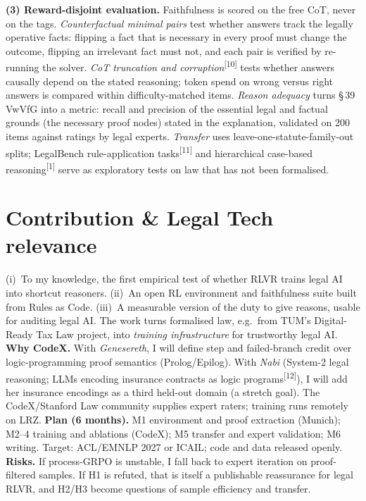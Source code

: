 \documentclass[10pt,a4paper]{article}
\newcommand{\cit}[1]{\textsuperscript{\color{muted}[#1]}}
\newcommand{\step}[1]{\textbf{\color{tum}#1}}
\begin{document}
\step{(3) Reward-disjoint evaluation.} Faithfulness is scored on the free CoT, never on the tags. \emph{Counterfactual minimal pairs} test whether answers track the legally operative facts: flipping a fact that is necessary in every proof must change the outcome, flipping an irrelevant fact must not, and each pair is verified by re-running the solver. \emph{CoT truncation and corruption}\cit{10} tests whether answers causally depend on the stated reasoning; token spend on wrong versus right answers is compared within difficulty-matched items. \emph{Reason adequacy} turns §\,39 VwVfG into a metric: recall and precision of the essential legal and factual grounds (the necessary proof nodes) stated in the explanation, validated on 200 items against ratings by legal experts. \emph{Transfer} uses leave-one-statute-family-out splits; LegalBench rule-application tasks\cit{11} and hierarchical case-based reasoning\cit{1} serve as exploratory tests on law that has not been formalised.

\section{Contribution \& Legal Tech relevance}
(i)~To my knowledge, the first empirical test of whether RLVR trains legal AI into shortcut reasoners. (ii)~An open RL environment and faithfulness suite built from Rules as Code. (iii)~A measurable version of the duty to give reasons, usable for auditing legal AI. The work turns formalised law, e.g.\ from TUM's Digital-Ready Tax Law project, into \emph{training infrastructure} for trustworthy legal AI.
\textbf{Why CodeX.} With \emph{Genesereth}, I will define step and failed-branch credit over logic-programming proof semantics (Prolog/Epilog). With \emph{Nabi} (System-2 legal reasoning; LLMs encoding insurance contracts as logic programs\cit{12}), I will add her insurance encodings as a third held-out domain (a stretch goal). The CodeX/Stanford Law community supplies expert raters; training runs remotely on LRZ.
\textbf{Plan (6 months).} M1 environment and proof extraction (Munich); M2–4 training and ablations (CodeX); M5 transfer and expert validation; M6 writing. Target: ACL/EMNLP 2027 or ICAIL; code and data released openly.
\textbf{Risks.} If process-GRPO is unstable, I fall back to expert iteration on proof-filtered samples. If H1 is refuted, that is itself a publishable reassurance for legal RLVR, and H2/H3 become questions of sample efficiency and transfer.
\end{document}
